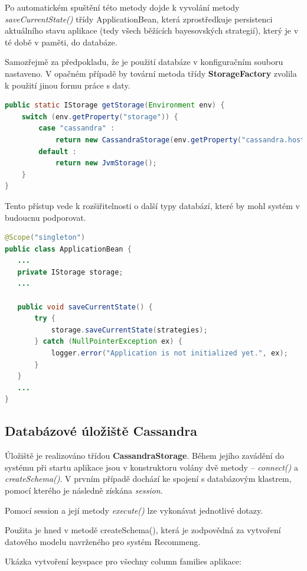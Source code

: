 \documentclass[thesis=M,czech]{FITthesis}[2014/05/07]
\begin{document}
Po automatickém spuštění této metody dojde k vyvolání metody \emph{saveCurrentState()} třídy ApplicationBean, která zprostředkuje persistenci aktuálního stavu aplikace (tedy všech běžících bayesovských strategií), který je v té době v paměti, do databáze.

Samozřejmě za předpokladu, že je použití databáze v konfiguračním souboru nastaveno. V opačném případě by tovární metoda třídy \textbf{StorageFactory} zvolila k použití jinou formu práce s daty.

\begin{lstlisting}[language=java]
public static IStorage getStorage(Environment env) {
    switch (env.getProperty("storage")) {
        case "cassandra" : 
            return new CassandraStorage(env.getProperty("cassandra.host"), env.getProperty("cassandra.keyspace"));                
        default : 
            return new JvmStorage();
    }
}
\end{lstlisting}

Tento přístup vede k rozšiřitelnosti o další typy databází, které by mohl systém v budoucnu podporovat. 

\begin{lstlisting}[language=java]
@Scope("singleton")
public class ApplicationBean {
   ...
   private IStorage storage;
   ...
   
   public void saveCurrentState() {
       try {
           storage.saveCurrentState(strategies);
       } catch (NullPointerException ex) {
           logger.error("Application is not initialized yet.", ex);
       }
   }
   ...
}   
\end{lstlisting}

\subsection{Databázové úložiště Cassandra}
Úložiště je realizováno třídou \textbf{CassandraStorage}. Během jejího zavádění do systému při startu aplikace jsou v konstruktoru volány dvě metody – \emph{connect()} a \emph{createSchema()}. V prvním případě dochází ke spojení s databázovým klastrem, pomocí kterého je následně získána \emph{session}.

Pomocí session a její metody \emph{execute()} lze vykonávat jednotlivé dotazy. 

Použita je hned v metodě createSchema(), která je zodpovědná za vytvoření datového modelu navrženého pro systém Recommeng.

Ukázka vytvoření keyspace pro všechny column families aplikace:
\end{document}
